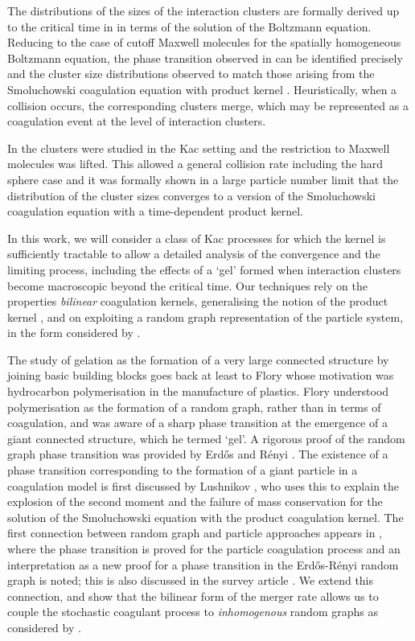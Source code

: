 The distributions of the sizes of the interaction clusters are formally derived up to the critical time in \cite{PSW16} in terms of the solution of the Boltzmann equation.
Reducing to the case of cutoff Maxwell molecules for the spatially homogeneous Boltzmann equation, the phase transition observed in \cite{GKSZ08} can be identified precisely and the cluster size distributions observed to match those arising from the Smoluchowski coagulation equation with product kernel \cite{L78,A99,PSW16}. Heuristically, when a collision occurs, the corresponding clusters merge, which may be represented as a coagulation event at the level of interaction clusters.

In \cite{PSW17} the clusters were studied in the Kac setting and the restriction to Maxwell molecules was lifted.
This allowed a general collision rate including the hard sphere case and it was formally shown in a large particle number limit that the distribution of the cluster sizes converges to a version of the Smoluchowski coagulation equation with a time-dependent product kernel. 

In this work, we will consider a class of Kac processes for which the kernel is sufficiently tractable to allow a detailed analysis of the convergence and the limiting process, including the effects of a `gel' formed when interaction clusters become macroscopic beyond the critical time. Our techniques rely on the properties \emph{bilinear} coagulation kernels, generalising the notion of the product kernel \cite{N00}, and on exploiting a random graph representation of the particle system, in the form considered by \cite{BJR07}.

The study of gelation as the formation of a very large connected structure by joining basic building blocks goes back at least to Flory \cite{Flo41} whose motivation was hydrocarbon polymerisation in the manufacture of plastics.
Flory understood polymerisation as the formation of a random graph, rather than in terms of coagulation, and was aware of a sharp phase transition at the emergence of a giant connected structure, which he termed `gel'.
A rigorous proof of the random graph phase transition was provided by Erd\H{o}s and R\'enyi \cite{ER60}.
The existence of a phase transition corresponding to the formation of a giant particle in a coagulation model is first discussed by Lushnikov \cite{L78}, who uses this to explain the explosion of the second moment and the failure of mass conservation for the solution of the Smoluchowski equation with the product coagulation kernel.
The first connection between random graph and particle approaches appears in \cite{BP91}, where the phase transition is proved for the particle coagulation process and an interpretation as a new proof for a phase transition in the Erd\H{o}s-R\'enyi random graph is noted; this is also discussed in the survey article \cite{A99}.
We extend this connection, and show that the bilinear form of the merger rate allows us to couple the stochastic coagulant process to \emph{inhomogenous} random graphs as considered by \cite{BJR07}.

